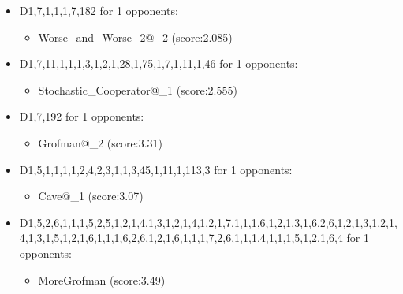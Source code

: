 \begin{appendices}
\begin{itemize}
        \item D1,7,1,1,1,7,182 for 1 opponents:
        \begin{multicols}{3}
            \begin{itemize}
                \item Worse\_and\_Worse\_2@\_2 (score:2.085)
            \end{itemize}
        \end{multicols}

        \item D1,7,11,1,1,1,3,1,2,1,28,1,75,1,7,1,11,1,46 for 1 opponents:
        \begin{multicols}{3}
            \begin{itemize}
                \item Stochastic\_Cooperator@\_1 (score:2.555)
            \end{itemize}
        \end{multicols}

        \item D1,7,192 for 1 opponents:
        \begin{multicols}{3}
            \begin{itemize}
                \item Grofman@\_2 (score:3.31)
            \end{itemize}
        \end{multicols}

        \item D1,5,1,1,1,1,2,4,2,3,1,1,3,45,1,11,1,113,3 for 1 opponents:
        \begin{multicols}{3}
            \begin{itemize}
                \item Cave@\_1 (score:3.07)
            \end{itemize}
        \end{multicols}

        \item D1,5,2,6,1,1,1,5,2,5,1,2,1,4,1,3,1,2,1,4,1,2,1,7,1,1,1,6,1,2,1,3,1,6,2,6,1,2,1,3,1,2,1,4,1,3,1,5,1,2,1,6,1,1,1,6,2,6,1,2,1,6,1,1,1,7,2,6,1,1,1,4,1,1,1,5,1,2,1,6,4 for 1 opponents:
        \begin{multicols}{3}
            \begin{itemize}
                \item MoreGrofman (score:3.49)
            \end{itemize}
        \end{multicols}


\end{itemize}
\end{appendices}
